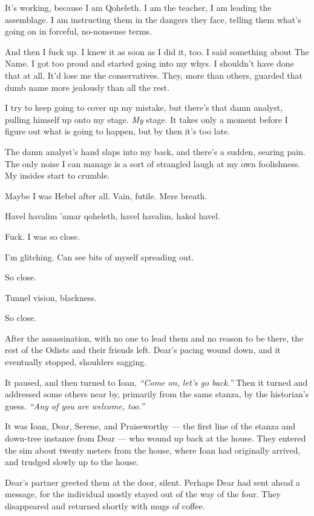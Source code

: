 It's working, because I am Qoheleth. I am the teacher, I am leading the assemblage. I am instructing them in the dangers they face, telling them what's going on in forceful, no-nonsense terms.

And then I fuck up. I knew it as soon as I did it, too. I said something about The Name. I got too proud and started going into my whys. I shouldn't have done that at all. It'd lose me the conservatives. They, more than others, guarded that dumb name more jealously than all the rest.

I try to keep going to cover up my mistake, but there's that damn analyst, pulling himself up onto my stage. \emph{My} stage. It takes only a moment before I figure out what is going to happen, but by then it's too late.

The damn analyst's hand slaps into my back, and there's a sudden, searing pain. The only noise I can manage is a sort of strangled laugh at my own foolishness. My insides start to crumble.

Maybe I was Hebel after all. Vain, futile. Mere breath.

Havel havalim 'amar qoheleth, havel havalim, hakol havel.

Fuck. I was so close.

I'm glitching. Can see bits of myself spreading out.

So close.

Tunnel vision, blackness.

So close.

\secdiv{}

\noindent After the assassination, with no one to lead them and no reason to be there, the rest of the Odists and their friends left. Dear's pacing wound down, and it eventually stopped, shoulders sagging.

It paused, and then turned to Ioan, \emph{``Come on, let's go back.''} Then it turned and addressed some others near by, primarily from the same stanza, by the historian's guess. \emph{``Any of you are welcome, too.''}

It was Ioan, Dear, Serene, and Praiseworthy --- the first line of the stanza and down-tree instance from Dear --- who wound up back at the house. They entered the sim about twenty meters from the house, where Ioan had originally arrived, and trudged slowly up to the house.

Dear's partner greeted them at the door, silent. Perhaps Dear had sent ahead a message, for the individual mostly stayed out of the way of the four. They disappeared and returned shortly with mugs of coffee.

